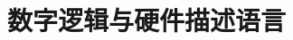\documentclass[../../main.tex]{subfiles}
\begin{document}
\chapter{数字逻辑与硬件描述语言}
\label{ch:02-digital-logic}






\end{document}
